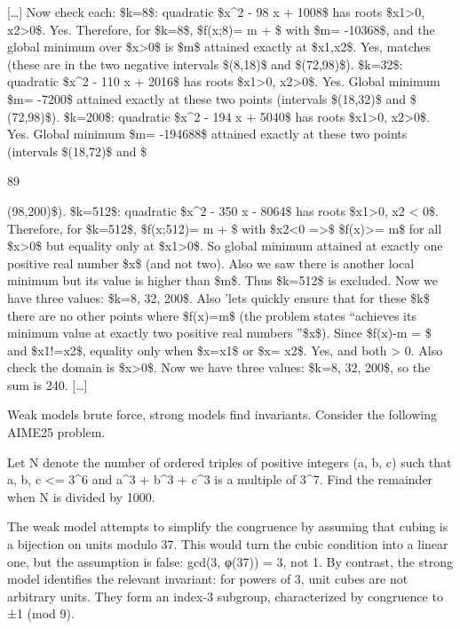 \documentclass[
  10
]{article}
\begin{document}
{[}\ldots{]} Now check each: \$k=8\$: quadratic \$x\^{}2 - 98 x + 1008\$
has roots \$x1\textgreater0, x2\textgreater0\$.
Yes. Therefore, for \$k=8\$, \$f(x;8)= m + \$
with \$m= -10368\$, and the global minimum over \$x\textgreater0\$ is
\$m\$ attained exactly at \$x1,x2\$. Yes, matches (these are in the two
negative intervals \$(8,18)\$ and \$(72,98)\$). \$k=32\$: quadratic
\$x\^{}2 - 110 x + 2016\$ has roots \$x1\textgreater0,
x2\textgreater0\$. Yes. Global minimum \$m= -7200\$ attained
exactly at these two points (intervals \$(18,32)\$ and \$ (72,98)\$).
\$k=200\$: quadratic \$x\^{}2 - 194 x + 5040\$ has roots
\$x1\textgreater0, x2\textgreater0\$. Yes.
Global minimum \$m= -194688\$ attained exactly at these two points
(intervals \$(18,72)\$ and \$

89

(98,200)\$). \$k=512\$: quadratic \$x\^{}2 - 350 x - 8064\$ has roots
\$x1\textgreater0, x2 \textless{} 0\$.
Therefore, for \$k=512\$, \$f(x;512)= m + \$
with \$x2\textless0 =\textgreater\$ \$f(x)\textgreater= m\$ for all
\$x\textgreater0\$ but equality only at \$x1\textgreater0\$. So global
minimum attained at exactly one positive real number \$x\$ (and not
two). Also we saw there is another local minimum but its value is higher
than \$m\$. Thus \$k=512\$ is excluded. Now we have three values: \$k=8,
32, 200\$. Also 'lets quickly ensure that for these \$k\$ there are no
other points where \$f(x)=m\$ (the problem states ``achieves its minimum
value at exactly two positive real numbers ''\$x\$). Since \$f(x)-m =
\$ and \$x1!=x2\$, equality only when
\$x=x1\$ or \$x= x2\$. Yes, and both \textgreater{} 0. Also check the
domain is \$x\textgreater0\$. Now we have three values: \$k=8, 32,
200\$, so the sum is 240. {[}\ldots{]}

Weak models brute force, strong models find invariants. Consider the
following AIME25 problem.

Let N denote the number of ordered triples of positive integers (a, b,
c) such that a, b, c \textless= 3\^{}6 and a\^{}3 + b\^{}3 + c\^{}3 is a
multiple of 3\^{}7. Find the remainder when N is divided by 1000.

The weak model attempts to simplify the congruence by assuming that
cubing is a bijection on units modulo 37. This would turn the cubic
condition into a linear one, but the assumption is false: gcd(3, φ(37))
= 3, not 1. By contrast, the strong model identifies the relevant
invariant: for powers of 3, unit cubes are not arbitrary units. They
form an index-3 subgroup, characterized by congruence to ±1 (mod 9).
\end{document}
